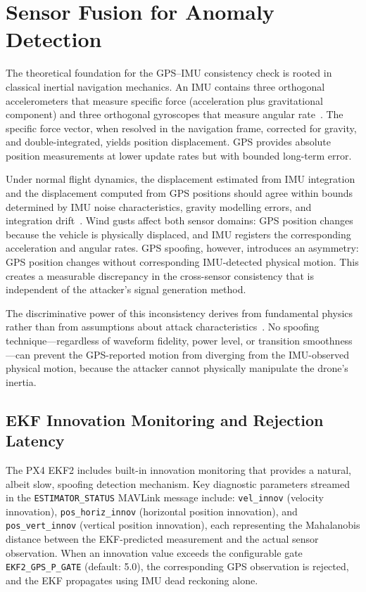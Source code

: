 \section{Sensor Fusion for Anomaly Detection}

The theoretical foundation for the GPS--IMU consistency check is rooted in classical inertial navigation mechanics. An IMU contains three orthogonal accelerometers that measure specific force (acceleration plus gravitational component) and three orthogonal gyroscopes that measure angular rate~\cite{Kim2021}. The specific force vector, when resolved in the navigation frame, corrected for gravity, and double-integrated, yields position displacement. GPS provides absolute position measurements at lower update rates but with bounded long-term error.

Under normal flight dynamics, the displacement estimated from IMU integration and the displacement computed from GPS positions should agree within bounds determined by IMU noise characteristics, gravity modelling errors, and integration drift~\cite{Liu2021}. Wind gusts affect both sensor domains: GPS position changes because the vehicle is physically displaced, and IMU registers the corresponding acceleration and angular rates. GPS spoofing, however, introduces an asymmetry: GPS position changes without corresponding IMU-detected physical motion. This creates a measurable discrepancy in the cross-sensor consistency that is independent of the attacker's signal generation method.

The discriminative power of this inconsistency derives from fundamental physics rather than from assumptions about attack characteristics~\cite{Bhardwaj2019}. No spoofing technique---regardless of waveform fidelity, power level, or transition smoothness---can prevent the GPS-reported motion from diverging from the IMU-observed physical motion, because the attacker cannot physically manipulate the drone's inertia.

\subsection{EKF Innovation Monitoring and Rejection Latency}

The PX4 EKF2 includes built-in innovation monitoring that provides a natural, albeit slow, spoofing detection mechanism. Key diagnostic parameters streamed in the \texttt{ESTIMATOR\_STATUS} MAVLink message include: \texttt{vel\_innov} (velocity innovation), \texttt{pos\_horiz\_innov} (horizontal position innovation), and \texttt{pos\_vert\_innov} (vertical position innovation), each representing the Mahalanobis distance between the EKF-predicted measurement and the actual sensor observation. When an innovation value exceeds the configurable gate \texttt{EKF2\_GPS\_P\_GATE} (default: 5.0), the corresponding GPS observation is rejected, and the EKF propagates using IMU dead reckoning alone.

